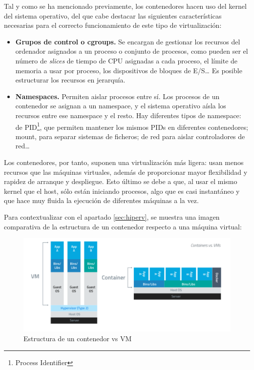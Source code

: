 	Tal y como se ha mencionado previamente, los contenedores hacen uso del kernel del sistema operativo, del que cabe destacar las siguientes características necesarias para el correcto funcionamiento de este tipo de virtualización:~\cite{cont3}

	\begin{itemize}
		\item \textbf{Grupos de control o cgroups.} Se encargan de gestionar los recursos del ordenador asignados a un proceso o conjunto de procesos, como pueden ser el número de \textit{slices} de tiempo de CPU asignadas a cada proceso, el límite de memoria a usar por proceso, los dispositivos de bloques de E/S… Es posible estructurar los recursos en jerarquía.
		\item \textbf{Namespaces.} Permiten aislar procesos entre sí. Los procesos de un contenedor se asignan a un namespace, y el sistema operativo aísla los recursos entre ese namespace y el resto. Hay diferentes tipos de namespace: de PID\footnote{Process Identifier}, que permiten mantener los mismos PIDs en diferentes contenedores; mount, para separar sistemas de ficheros; de red para aislar controladores de red… 
	\end{itemize}

	Los contenedores, por tanto, suponen una virtualización más ligera: usan menos recursos que las máquinas virtuales, además de proporcionar mayor flexibilidad y rapidez de arranque y despliegue. Esto último se debe a que, al usar el mismo kernel que el host, sólo están iniciando procesos, algo que es casi instantáneo y que hace muy fluida la ejecución de diferentes máquinas a la vez.

	Para contextualizar con el apartado \ref{sec:hiperv}, se muestra una imagen comparativa de la estructura de un contenedor respecto a una máquina virtual:

	\begin{figure}[h]
	\centering
	\includegraphics[width=\textwidth]{../imgs/EdA/VMvsCont.png}
	\caption{Estructura de un contenedor vs VM}
	\label{fig:VMvsDocker}
	\end{figure}

